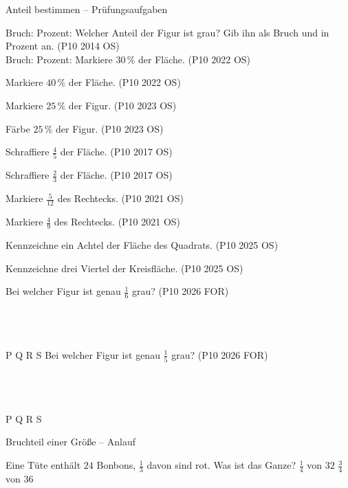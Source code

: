 \begin{aufgabe}{Anteil bestimmen – Prüfungsaufgaben}
\begin{teile}
Bruch: \leerfeld Prozent: \leerfeld[\%]
\teil Welcher Anteil der Figur ist grau? Gib ihn als Bruch und in Prozent an. \hfill (P10 2014 OS) \\

Bruch: \leerfeld Prozent: \leerfeld[\%]
\teil Markiere $30\,\%$ der Fläche. \hfill (P10 2022 OS)

\teil Markiere $40\,\%$ der Fläche. \hfill (P10 2022 OS)

\teil Markiere $25\,\%$ der Figur. \hfill (P10 2023 OS)

\teil Färbe $25\,\%$ der Figur. \hfill (P10 2023 OS)

\teil Schraffiere $\frac{4}{5}$ der Fläche. \hfill (P10 2017 OS)

\teil Schraffiere $\frac{2}{3}$ der Fläche. \hfill (P10 2017 OS)

\teil Markiere $\frac{5}{12}$ des Rechtecks. \hfill (P10 2021 OS)

\teil Markiere $\frac{4}{9}$ des Rechtecks. \hfill (P10 2021 OS)

\teil Kennzeichne ein Achtel der Fläche des Quadrats. \hfill (P10 2025 OS)

\teil Kennzeichne drei Viertel der Kreisfläche. \hfill (P10 2025 OS)

\kreisleer[2]
\teil Bei welcher Figur ist genau $\frac{1}{6}$ grau? \hfill (P10 2026 FOR)\\ \\ \\ \\ 

P  \quad Q  \quad R  \quad S 
\teil Bei welcher Figur ist genau $\frac{1}{5}$ grau? \hfill (P10 2026 FOR)\\ \\ \\ \\ 

P  \quad Q  \quad R  \quad S 
\end{teile}
\end{aufgabe}

\begin{aufgabe}{Bruchteil einer Größe – Anlauf}
\begin{teile}
\teil Eine Tüte enthält $24$ Bonbons, $\frac{1}{3}$ davon sind rot. Was ist das Ganze?
\teil $\frac{1}{4}$ von $32$
\teil $\frac{3}{4}$ von $36$
\end{teile}
\end{aufgabe}

